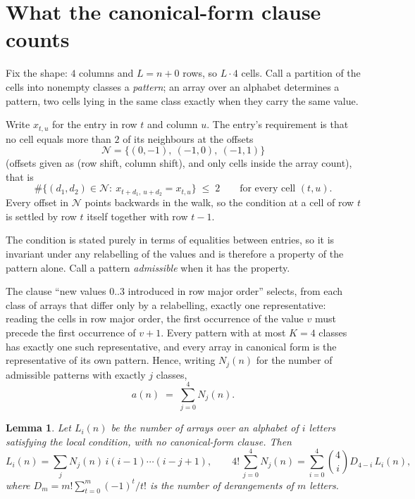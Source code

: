 \documentclass[11pt,a4paper]{article}
\theoremstyle{plain}
\newtheorem{lemma}[theorem]{Lemma}
\theoremstyle{definition}
\begin{document}
\section{What the canonical-form clause counts}

Fix the shape: $4$ columns and $L=n+0$ rows, so $L\cdot4$ cells. Call a
partition of the cells into nonempty classes a \emph{pattern}; an array over an alphabet
determines a pattern, two cells lying in the same class exactly when they carry the same
value.

Write $x_{t,u}$ for the entry in row $t$ and column $u$. The
entry's requirement is that no cell equals more than $2$ of its neighbours at the
offsets
\[
\mathcal N=\{(0,-1),\ (-1,0),\ (-1,1)\}
\]
(offsets given as (row shift, column shift), and only cells inside the array count),
that is
\begin{equation}\label{eq:loc}
\#\bigl\{(d_1,d_2)\in\mathcal N:\ x_{t+d_1,\,u+d_2}=x_{t,u}\bigr\}\;\le\;2
\qquad\text{for every cell }(t,u).
\end{equation}
Every offset in $\mathcal N$ points backwards in the walk, so the condition at a cell of
row $t$ is settled by row $t$ itself together with row $t-1$.

The condition is stated purely in terms of equalities between entries, so it is invariant
under any relabelling of the values and is therefore a property of the pattern alone. Call a
pattern \emph{admissible} when it has the property.

The clause ``new values $0..3$ introduced in row major order'' selects, from each class
of arrays that differ only by a relabelling, exactly one representative: reading the cells in
row major order, the first occurrence of the value $v$ must precede the first occurrence of
$v+1$. Every pattern with at most $K=4$ classes has exactly one such representative, and
every array in canonical form is the representative of its own pattern. Hence, writing
$N_j(n)$ for the number of admissible patterns with exactly $j$ classes,
\begin{equation}\label{eq:apat}
a(n)\;=\;\sum_{j=0}^{4}N_j(n).
\end{equation}

\begin{lemma}\label{lem:inv}
Let $L_i(n)$ be the number of arrays over an alphabet of $i$ letters satisfying the local
condition, with no canonical-form clause. Then
\[
L_i(n)=\sum_j N_j(n)\,i(i-1)\cdots(i-j+1),
\qquad
4!\,\sum_{j=0}^{4}N_j(n)=\sum_{i=0}^{4}\binom{4}{i}D_{4-i}\,L_i(n),
\]
where $D_m=m!\sum_{t=0}^{m}(-1)^t/t!$ is the number of derangements of $m$ letters.
\end{lemma}
\end{document}
